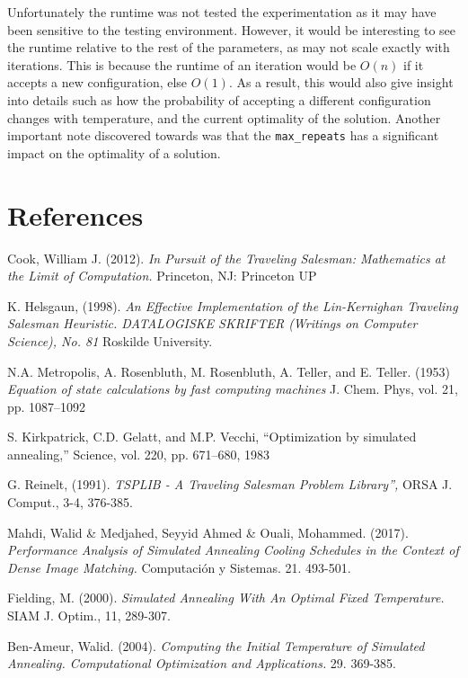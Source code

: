 \documentclass{article}
\begin{document}
Unfortunately the runtime was not tested the experimentation as it may have been sensitive to the testing environment.
However, it would be interesting to see the runtime relative to the rest of the parameters, as may not scale exactly with iterations.
This is because the runtime of an iteration would be $O(n)$ if it accepts a new configuration, else $O(1)$.
As a result, this would also give insight into details such as how the probability of accepting a different configuration changes with temperature, and the current optimality of the solution.
Another important note discovered towards was that the \texttt{max\_repeats} has a significant impact on the optimality of a solution.


\newpage
\section{References}

\begin{thebibliography}{9}

Cook, William J. (2012). \emph{In Pursuit of the Traveling Salesman: Mathematics at the Limit of Computation.} Princeton, NJ: Princeton UP

K. Helsgaun, (1998). \emph{An Effective Implementation of the Lin-Kernighan Traveling Salesman Heuristic. DATALOGISKE SKRIFTER (Writings on Computer Science), No. 81} Roskilde University.

N.A. Metropolis, A. Rosenbluth, M. Rosenbluth, A. Teller, and E. Teller. (1953) \emph{Equation of state calculations by
fast computing machines} J. Chem. Phys, vol. 21, pp. 1087–1092

S. Kirkpatrick, C.D. Gelatt, and M.P. Vecchi, “Optimization by simulated annealing,” Science, vol. 220, pp.
671–680, 1983

G. Reinelt, (1991). \emph{TSPLIB - A Traveling Salesman Problem Library”,} ORSA J. Comput., 3-4, 376-385.

Mahdi, Walid \& Medjahed, Seyyid Ahmed \& Ouali, Mohammed. (2017). \emph{Performance Analysis of Simulated Annealing Cooling Schedules in the Context of Dense Image Matching.} Computación y Sistemas. 21. 493-501.

Fielding, M. (2000). \emph{Simulated Annealing With An Optimal Fixed Temperature.} SIAM J. Optim., 11, 289-307.

Ben-Ameur, Walid. (2004). \emph{Computing the Initial Temperature of Simulated Annealing. Computational Optimization and Applications.} 29. 369-385.



\end{thebibliography}
\end{document}
